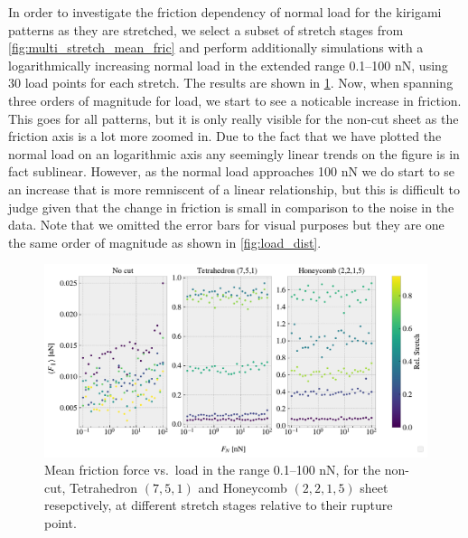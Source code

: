 In order to investigate the friction dependency of normal load for the kirigami
patterns as they are stretched, we select a subset of stretch stages from
\cref{fig:multi_stretch_mean_fric} and perform additionally simulations with a
logarithmically increasing normal load in the extended range 0.1--100 nN, using
30 load points for each stretch. The results are shown in
\cref{fig:load_dependency}. Now, when spanning three orders of magnitude for
load, we start to see a noticable increase in friction. This goes for all
patterns, but it is only really visible for the non-cut sheet as the friction
axis is a lot more zoomed in. Due to the fact that we have plotted the normal
load on an logarithmic axis any seemingly linear trends on the figure is in fact
sublinear. However, as the normal load approaches 100 nN we do start to se an
increase that is more remniscent of a linear relationship, but this is difficult
to judge given that the change in friction is small in comparison to the noise
in the data. Note that we omitted the error bars for visual purposes but they
are one the same order of magnitude as shown in \cref{fig:load_dist}.


\begin{figure}[H]
  \centering
  \includegraphics[width=\linewidth]{figures/baseline/multi_FN_mean_compare.pdf}
  \caption{Mean friction force vs.\ load in the range 0.1--100 nN, for the non-cut, Tetrahedron $(7,5,1)$ and Honeycomb $(2,2,1,5)$ sheet resepctively, at different stretch stages relative to their rupture point. }
  \label{fig:load_dependency}
\end{figure}

